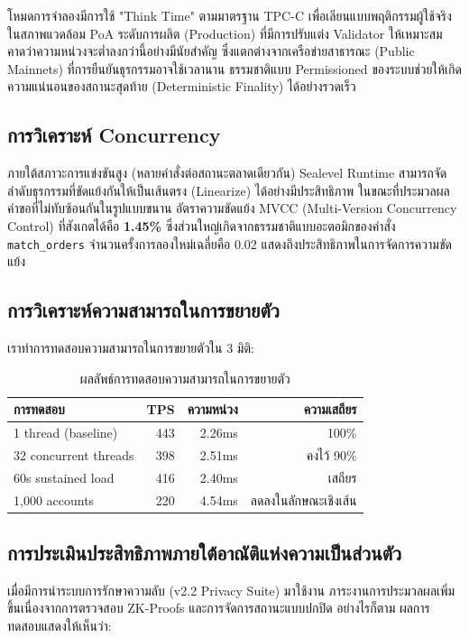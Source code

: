 \documentclass[conference,10pt]{IEEEtran}
\begin{document}
โหมดการจำลองมีการใช้ "Think Time" ตามมาตรฐาน TPC-C เพื่อเลียนแบบพฤติกรรมผู้ใช้จริง ในสภาพแวดล้อม PoA ระดับการผลิต (Production) ที่มีการปรับแต่ง Validator ให้เหมาะสม คาดว่าความหน่วงจะต่ำลงกว่านี้อย่างมีนัยสำคัญ ซึ่งแตกต่างจากเครือข่ายสาธารณะ (Public Mainnets) ที่การยืนยันธุรกรรมอาจใช้เวลานาน ธรรมชาติแบบ Permissioned ของระบบช่วยให้เกิดความแน่นอนของสถานะสุดท้าย (Deterministic Finality) ได้อย่างรวดเร็ว

\subsection{การวิเคราะห์ Concurrency}
ภายใต้สภาวะการแข่งขันสูง (หลายคำสั่งต่อสถานะตลาดเดียวกัน) Sealevel Runtime สามารถจัดลำดับธุรกรรมที่ขัดแย้งกันให้เป็นเส้นตรง (Linearize) ได้อย่างมีประสิทธิภาพ ในขณะที่ประมวลผลคำขอที่ไม่ทับซ้อนกันในรูปแบบขนาน อัตราความขัดแย้ง MVCC (Multi-Version Concurrency Control) ที่สังเกตได้คือ \textbf{1.45\%} ซึ่งส่วนใหญ่เกิดจากธรรมชาติแบบอะตอมิกของคำสั่ง \texttt{match\_orders} จำนวนครั้งการลองใหม่เฉลี่ยคือ 0.02 แสดงถึงประสิทธิภาพในการจัดการความขัดแย้ง

\subsection{การวิเคราะห์ความสามารถในการขยายตัว}
เราทำการทดสอบความสามารถในการขยายตัวใน 3 มิติ:

\begin{table}[t!]
\caption{ผลลัพธ์การทดสอบความสามารถในการขยายตัว}
\begin{center}
\begin{tabular}{|l|r|r|r|}
\hline
\textbf{การทดสอบ} & \textbf{TPS} & \textbf{ความหน่วง} & \textbf{ความเสถียร} \\
\hline
1 thread (baseline) & 443 & 2.26ms & 100\% \\
32 concurrent threads & 398 & 2.51ms & คงไว้ 90\% \\
60s sustained load & 416 & 2.40ms & เสถียร \\
1,000 accounts & 220 & 4.54ms & ลดลงในลักษณะเชิงเส้น \\
\hline
\end{tabular}
\label{tab:scalability}
\end{center}
\end{table}

\subsection{การประเมินประสิทธิภาพภายใต้อาณัติแห่งความเป็นส่วนตัว}
เมื่อมีการนำระบบการรักษาความลับ (v2.2 Privacy Suite) มาใช้งาน ภาระงานการประมวลผลเพิ่มขึ้นเนื่องจากการตรวจสอบ ZK-Proofs และการจัดการสถานะแบบปกปิด อย่างไรก็ตาม ผลการทดสอบแสดงให้เห็นว่า:
\end{document}
